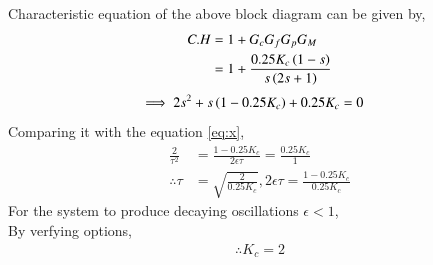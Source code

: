\documentclass[journal,12pt,twocolumn]{IEEEtran}
\theoremstyle{remark}
\begin{document}
Characteristic equation of the above block diagram can be given by,
\begin{align}
     C.H &= 1+G_c G_f G_p G_M   \\
     &= 1+\frac{0.25 K_c \left(1-s\right) }{s\left(2s+1\right)} 
\end{align}
\begin{align}
    \implies 2s^2+s\left(1-0.25K_c\right)+0.25K_c&=0  
\end{align}
Comparing it with the equation \eqref{eq:x},
\begin{align}
    \frac{2}{\tau^2}&=\frac{1-0.25K_c}{2\epsilon \tau}=\frac{0.25K_c}{1}    \\
    \therefore \tau&=\sqrt{\frac{2}{0.25K_c}} , 2\epsilon\tau=\frac{1-0.25K_c}{0.25K_c}
\end{align}
For the system to produce decaying oscillations {$\epsilon <1$},    \\
By verfying options,
\begin{align}
    \therefore \boxed{K_c=2}
\end{align}
\end{document}
